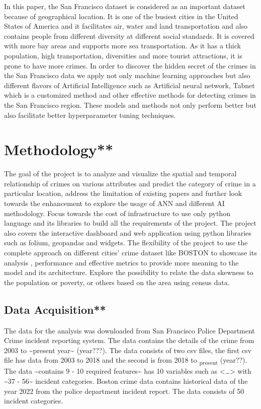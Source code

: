 \documentclass[conference,final,]{IEEEtran}
\begin{document}
In this paper, the San Francisco dataset is considered as an important
dataset because of geographical location. It is one of the busiest
cities in the United States of America and it facilitates air, water and
land transportation and also contains people from different diversity at
different social standards. It is covered with more bay areas and
supports more sea transportation. As it has a thick population, high
transportation, diversities and more tourist attractions, it is prone to
have more crimes. In order to discover the hidden secret of the crimes
in the San Francisco data we apply not only machine learning approaches
but also different flavors of Artificial Intelligence such as Artificial
neural network, Tabnet which is a customized method and other effective
methods for detecting crimes in the San Francisco region. These models
and methods not only perform better but also facilitate better
hyperparameter tuning techniques.

\section{Methodology**}\label{methodology}

The goal of the project is to analyze and visualize the spatial and
temporal relationship of crimes on various attributes and predict the
category of crime in a particular location, address the limitation of
existing papers and further look towards the enhancement to explore the
usage of ANN and different AI methodology. Focus towards the cost of
infrastructure to use only python language and its libraries to build
all the requirements of the project. The project also covers the
interactive dashboard and web application using python libraries such as
folium, geopandas and widgets. The flexibility of the project to use the
complete approach on different cities' crime dataset like BOSTON to
showcase its analysis , performance and effective metrics to provide
more meaning to the model and its architecture. Explore the possibility
to relate the data skewness to the population or poverty, or others
based on the area using census data.

\subsection{Data Acquisition**}\label{data-acquisition}

The data for the analysis was downloaded from San Francisco Police
Department Crime incident reporting system. The data contains the
details of the crime from 2003 to \textasciitilde present
year\textasciitilde{} (year???). The data consists of two csv files, the
first csv file has data from 2003 to 2018 and the second is from 2018 to
\textsubscript{present} (year??). The data \textasciitilde contains 9 -
10 required features\textasciitilde{} has 10 variables such as
\textless\ldots\textgreater{} with \textasciitilde37 -
56\textasciitilde{} incident categories. Boston crime data contains
historical data of the year 2022 from the police department incident
report. The data consists of 50 incident categories.
\end{document}

